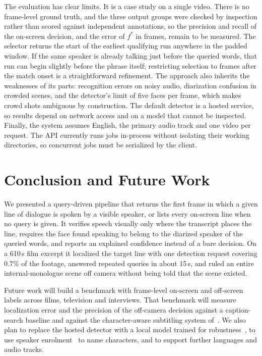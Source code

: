 \documentclass[conference]{IEEEtran}
\begin{document}
The evaluation has clear limits. It is a case study on a single video. There is no frame-level ground truth, and the three output groups were checked by inspection rather than scored against independent annotations, so the precision and recall of the on-screen decision, and the error of $f^\ast$ in frames, remain to be measured. The selector returns the start of the earliest qualifying run anywhere in the padded window. If the same speaker is already talking just before the queried words, that run can begin slightly before the phrase itself; restricting selection to frames after the match onset is a straightforward refinement. The approach also inherits the weaknesses of its parts: recognition errors on noisy audio, diarization confusion in crowded scenes, and the detector's limit of five faces per frame, which makes crowd shots ambiguous by construction. The default detector is a hosted service, so results depend on network access and on a model that cannot be inspected. Finally, the system assumes English, the primary audio track and one video per request. The API currently runs jobs in-process without isolating their working directories, so concurrent jobs must be serialized by the client.

\section{Conclusion and Future Work}
\label{sec:conclusion}

We presented a query-driven pipeline that returns the first frame in which a given line of dialogue is spoken by a visible speaker, or lists every on-screen line when no query is given. It verifies speech visually only where the transcript places the line, requires the face found speaking to belong to the diarized speaker of the queried words, and reports an explained confidence instead of a bare decision. On a 610\,s film excerpt it localized the target line with one detection request covering 0.7\% of the footage, answered repeated queries in about 15\,s, and ruled an entire internal-monologue scene off camera without being told that the scene existed.

Future work will build a benchmark with frame-level on-screen and off-screen labels across films, television and interviews. That benchmark will measure localization error and the precision of the off-camera decision against a caption-search baseline and against the character-aware subtitling system of~\cite{huh2024context}. We also plan to replace the hosted detector with a local model trained for robustness~\cite{liao2025lrasd,nguyen2026unitalk}, to use speaker enrolment~\cite{wang2026beyond} to name characters, and to support further languages and audio tracks.
\end{document}
